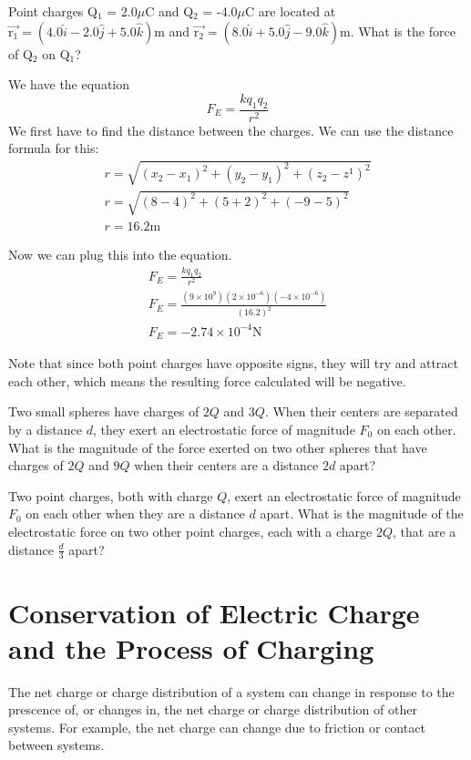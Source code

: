 \documentclass[../em.tex]{subfiles}
\begin{document}
\pagebreak
\begin{example}
    Point charges Q$_1$ = 2.0$\mu$C and Q$_2$ = -4.0$\mu$C are located at $\vec{\text{r}_1} = (4.0\hat{i}-2.0\hat{j}+5.0\hat{k})$m and 
    $\vec{\text{r}_2} = (8.0\hat{i}+5.0\hat{j}-9.0\hat{k})$m. What is the force of Q$_2$ on Q$_1$?

    We have the equation 
    \[F_E=\frac{kq_1q_2}{r^2}\]
    We first have to find the distance between the charges. We can use the distance formula for this:
    \begin{align*}
        r = \sqrt{(x_2-x_1)^2+(y_2-y_1)^2+(z_2-z^1)^2}\\
        r = \sqrt{(8-4)^2+(5+2)^2+(-9-5)^2}\\
        r = 16.2 \text{m}
    \end{align*}

    Now we can plug this into the equation.
    \begin{align*}
        F_E=\frac{kq_1q_2}{r^2}\\
        F_E=\frac{(9\times10^9)(2\times10^{-6})(-4\times10^{-6})}{(16.2)^2}\\
        F_E=-2.74\times10^{-4}\text{N}
    \end{align*}

    Note that since both point charges have opposite signs, they will try and attract each other, which means the resulting force calculated 
    will be negative.
\end{example}

\ex Two small spheres have charges of $2Q$ and $3Q$. When their centers are separated by a distance $d$, they exert an electrostatic force of magnitude $F_0$ on each other. What is the magnitude of the force exerted on two other spheres that have charges of $2Q$ and $9Q$ when their centers are a distance $2d$ apart? 

\ex Two point charges, both with charge $Q$, exert an electrostatic force of magnitude $F_0$ on each other when they are a distance $d$ apart. What is the magnitude of the electrostatic force on two other point charges, each with a charge $2Q$, that are a distance $\frac{d}{3}$ apart?

\section{Conservation of Electric Charge and the Process of Charging}
The net charge or charge distribution of a system can change in response to the prescence of, 
or changes in, the net charge or charge distribution of other systems. For example, the net charge 
can change due to friction or contact between systems.
\end{document}
